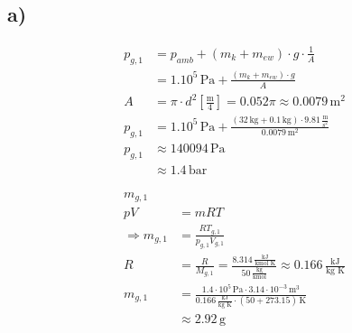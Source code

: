 

\subsection*{a)}

\begin{align*}
p_{g,1} &= p_{amb} + (m_k + m_{ew}) \cdot g \cdot \frac{1}{A} \\
&= 1.10^5 \, \text{Pa} + \frac{(m_k + m_{ew}) \cdot g}{A} \\
A &= \pi \cdot d^2 \left[ \frac{\text{m}}{4} \right] = 0.052 \pi \approx 0.0079 \, \text{m}^2 \\
p_{g,1} &= 1.10^5 \, \text{Pa} + \frac{(32 \, \text{kg} + 0.1 \, \text{kg}) \cdot 9.81 \, \frac{\text{m}}{\text{s}^2}}{0.0079 \, \text{m}^2} \\
p_{g,1} &\approx 140094 \, \text{Pa} \\
&\approx 1.4 \, \text{bar}
\end{align*}

\begin{align*}
m_{g,1} \\
pV &= mRT \\
\Rightarrow m_{g,1} &= \frac{RT_{g,1}}{p_{g,1} V_{g,1}} \\
R &= \frac{R}{M_{g,1}} = \frac{8.314 \, \frac{\text{kJ}}{\text{kmol K}}}{50 \, \frac{\text{kg}}{\text{kmol}}} \approx 0.166 \, \frac{\text{kJ}}{\text{kg K}} \\
m_{g,1} &= \frac{1.4 \cdot 10^5 \, \text{Pa} \cdot 3.14 \cdot 10^{-3} \, \text{m}^3}{0.166 \, \frac{\text{kJ}}{\text{kg K}} \cdot (50 + 273.15) \, \text{K}} \\
&\approx 2.92 \, \text{g}
\end{align*}